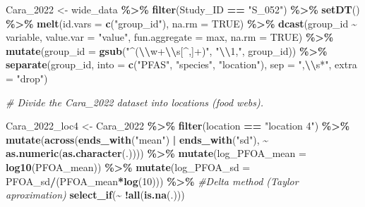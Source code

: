 \documentclass[
]{article}
\newenvironment{Shaded}{\begin{snugshade}}{\end{snugshade}}
\newcommand{\AttributeTok}[1]{\textcolor[rgb]{0.13,0.29,0.53}{#1}}
\newcommand{\CommentTok}[1]{\textcolor[rgb]{0.56,0.35,0.01}{\textit{#1}}}
\newcommand{\ConstantTok}[1]{\textcolor[rgb]{0.56,0.35,0.01}{#1}}
\newcommand{\DecValTok}[1]{\textcolor[rgb]{0.00,0.00,0.81}{#1}}
\newcommand{\FunctionTok}[1]{\textcolor[rgb]{0.13,0.29,0.53}{\textbf{#1}}}
\newcommand{\NormalTok}[1]{#1}
\newcommand{\OtherTok}[1]{\textcolor[rgb]{0.56,0.35,0.01}{#1}}
\newcommand{\SpecialCharTok}[1]{\textcolor[rgb]{0.81,0.36,0.00}{\textbf{#1}}}
\newcommand{\StringTok}[1]{\textcolor[rgb]{0.31,0.60,0.02}{#1}}
\begin{document}
\begin{Shaded}
\begin{Highlighting}[]
\NormalTok{Cara\_2022 }\OtherTok{\textless{}{-}}\NormalTok{ wide\_data }\SpecialCharTok{\%\textgreater{}\%} 
  \FunctionTok{filter}\NormalTok{(Study\_ID }\SpecialCharTok{==} \StringTok{"S\_052"}\NormalTok{) }\SpecialCharTok{\%\textgreater{}\%}
  \FunctionTok{setDT}\NormalTok{() }\SpecialCharTok{\%\textgreater{}\%} 
  \FunctionTok{melt}\NormalTok{(}\AttributeTok{id.vars =} \FunctionTok{c}\NormalTok{(}\StringTok{"group\_id"}\NormalTok{), }\AttributeTok{na.rm =} \ConstantTok{TRUE}\NormalTok{) }\SpecialCharTok{\%\textgreater{}\%} 
  \FunctionTok{dcast}\NormalTok{(group\_id }\SpecialCharTok{\textasciitilde{}}\NormalTok{ variable, }\AttributeTok{value.var =} \StringTok{"value"}\NormalTok{, }\AttributeTok{fun.aggregate =}\NormalTok{ max, }\AttributeTok{na.rm =} \ConstantTok{TRUE}\NormalTok{) }\SpecialCharTok{\%\textgreater{}\%} 
  \FunctionTok{mutate}\NormalTok{(}\AttributeTok{group\_id =} \FunctionTok{gsub}\NormalTok{(}\StringTok{"\^{}(}\SpecialCharTok{\textbackslash{}\textbackslash{}}\StringTok{w+}\SpecialCharTok{\textbackslash{}\textbackslash{}}\StringTok{s[\^{},]+)"}\NormalTok{, }\StringTok{"}\SpecialCharTok{\textbackslash{}\textbackslash{}}\StringTok{1,"}\NormalTok{, group\_id)) }\SpecialCharTok{\%\textgreater{}\%} 
  \FunctionTok{separate}\NormalTok{(group\_id, }\AttributeTok{into =} \FunctionTok{c}\NormalTok{(}\StringTok{"PFAS"}\NormalTok{, }\StringTok{"species"}\NormalTok{, }\StringTok{"location"}\NormalTok{), }\AttributeTok{sep =} \StringTok{",}\SpecialCharTok{\textbackslash{}\textbackslash{}}\StringTok{s*"}\NormalTok{, }\AttributeTok{extra =} \StringTok{"drop"}\NormalTok{)}

\CommentTok{\# Divide the Cara\_2022 dataset into locations (food webs).}

\NormalTok{Cara\_2022\_loc4 }\OtherTok{\textless{}{-}}\NormalTok{ Cara\_2022 }\SpecialCharTok{\%\textgreater{}\%} 
  \FunctionTok{filter}\NormalTok{(location }\SpecialCharTok{==} \StringTok{"location 4"}\NormalTok{) }\SpecialCharTok{\%\textgreater{}\%}
  \FunctionTok{mutate}\NormalTok{(}\FunctionTok{across}\NormalTok{(}\FunctionTok{ends\_with}\NormalTok{(}\StringTok{"mean"}\NormalTok{) }\SpecialCharTok{|} \FunctionTok{ends\_with}\NormalTok{(}\StringTok{"sd"}\NormalTok{), }\SpecialCharTok{\textasciitilde{}} \FunctionTok{as.numeric}\NormalTok{(}\FunctionTok{as.character}\NormalTok{(.)))) }\SpecialCharTok{\%\textgreater{}\%} 
  \FunctionTok{mutate}\NormalTok{(}\AttributeTok{log\_PFOA\_mean =} \FunctionTok{log10}\NormalTok{(PFOA\_mean)) }\SpecialCharTok{\%\textgreater{}\%}
  \FunctionTok{mutate}\NormalTok{(}\AttributeTok{log\_PFOA\_sd =}\NormalTok{ PFOA\_sd}\SpecialCharTok{/}\NormalTok{(PFOA\_mean}\SpecialCharTok{*}\FunctionTok{log}\NormalTok{(}\DecValTok{10}\NormalTok{))) }\SpecialCharTok{\%\textgreater{}\%} \CommentTok{\#Delta method (Taylor aproximation)}
  \FunctionTok{select\_if}\NormalTok{(}\SpecialCharTok{\textasciitilde{}} \SpecialCharTok{!}\FunctionTok{all}\NormalTok{(}\FunctionTok{is.na}\NormalTok{(.)))}


\end{Highlighting}
\end{Shaded}
\end{document}
